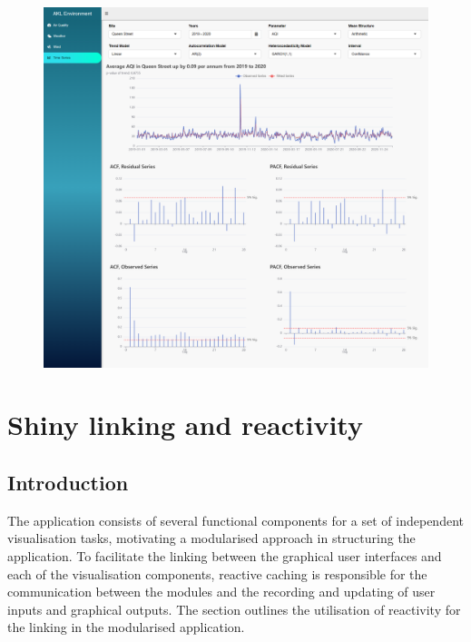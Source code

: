 \documentclass{aucklandthesis}
\begin{document}
\begin{figure}
\includegraphics[width=1\linewidth]{figures/ts-tab} \end{figure}

\hypertarget{ch:linking}{%
\chapter{Shiny linking and reactivity}\label{ch:linking}}

\hypertarget{introduction-2}{%
\section{Introduction}\label{introduction-2}}

The application consists of several functional components for a set of independent visualisation tasks, motivating a modularised approach in structuring the application. To facilitate the linking between the graphical user interfaces and each of the visualisation components, reactive caching is responsible for the communication between the modules and the recording and updating of user inputs and graphical outputs. The section outlines the utilisation of reactivity for the linking in the modularised application.
\end{document}
